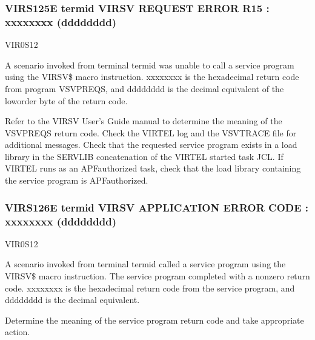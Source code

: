 \documentclass[letterpaper,10pt,english]{sphinxmanual}
\begin{document}
\subsubsection{VIRS125E termid VIRSV REQUEST ERROR \textendash{} R15 : xxxxxxxx (dddddddd)}
\label{\detokenize{messages:virs125e-termid-virsv-request-error-r15-xxxxxxxx-dddddddd}}\begin{description}
\sphinxAtStartPar
VIR0S12

\sphinxAtStartPar
A scenario invoked from terminal termid was unable to call a service program using the VIRSV\$ macro instruction. xxxxxxxx is the hexadecimal return code from program VSVPREQS, and dddddddd is the decimal equivalent of the low\sphinxhyphen{}order byte of the return code.

\sphinxAtStartPar
Refer to the VIRSV User’s Guide manual to determine the meaning of the VSVPREQS return code. Check the VIRTEL log and the VSVTRACE file for additional messages. Check that the requested service program exists in a load library in the SERVLIB concatenation of the VIRTEL started task JCL. If VIRTEL runs as an APF\sphinxhyphen{}authorized task, check that the load library containing the service program is APF\sphinxhyphen{}authorized.

\end{description}


\subsubsection{VIRS126E termid VIRSV APPLICATION ERROR CODE : xxxxxxxx (dddddddd)}
\label{\detokenize{messages:virs126e-termid-virsv-application-error-code-xxxxxxxx-dddddddd}}\begin{description}
\sphinxAtStartPar
VIR0S12

\sphinxAtStartPar
A scenario invoked from terminal termid called a service program using the VIRSV\$ macro instruction. The service program completed with a non\sphinxhyphen{}zero return code. xxxxxxxx is the hexadecimal return code from the service program, and dddddddd is the decimal equivalent.

\sphinxAtStartPar
Determine the meaning of the service program return code and take appropriate action.

\end{description}
\end{document}
